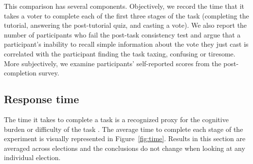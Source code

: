 \documentclass[runningheads]{llncs}
\newcommand{\kibitz}[2]{\ifnum\Comments=1{\color{#1}{#2}}\fi}
\newcommand{\gb}[1]{\kibitz{brown}{[GB:#1]}}
\begin{document}
This comparison has several components. Objectively, we record the time that it takes a voter to complete each of the first three stages of the task (completing the tutorial, answering the post-tutorial quiz, and casting a vote). %
We also report the number  of participants who fail the post-task consistency test and argue that a participant's inability  to recall simple information about the vote they just cast is correlated with the participant finding the task taxing, confusing or tiresome. 
More subjectively, we examine participants' self-reported scores from the post-completion survey. 


 


\subsection{Response time}
The time it takes to complete a task is a recognized  proxy for  the cognitive burden  or difficulty of the task  \cite{rauterberg1992method}.  
%
The average time to complete each stage of the experiment is visually represented in  Figure~\ref{fig:time}.  Results in this section are averaged across elections and the conclusions do not change when looking at any individual election. %
\end{document}
